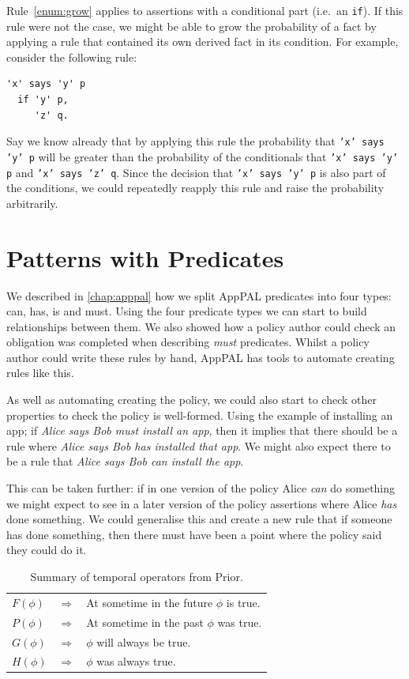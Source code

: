 \documentclass[thesis.tex]{subfiles}
\begin{document}
Rule~\ref{enum:grow} applies to assertions with a conditional part (i.e.~an
\texttt{if}). If this rule were not the case, we might be able to grow the
probability of a fact by applying a rule that contained its own derived fact in
its condition. For example, consider the following rule:
\begin{lstlisting}
'x' says 'y' p
  if 'y' p,
     'z' q.
\end{lstlisting} Say we know already that by applying this rule the probability
that \texttt{'x' says 'y' p} will be greater than the probability of the
conditionals that \texttt{'x' says 'y' p} and \texttt{'x' says 'z' q}. Since the
decision that \texttt{'x' says 'y' p} is also part of the conditions, we could
repeatedly reapply this rule and raise the probability arbitrarily.

\section{Patterns with Predicates}
\label{sec:patterns-with-predicates}

We described in \autoref{chap:apppal} how we split AppPAL predicates into four types: can, has, is and must.
Using the four predicate types we can start to build relationships between them.
We also showed how a policy author could check an obligation was completed when
describing \emph{must} predicates.  Whilst a policy author could write these
rules by hand, AppPAL has tools to automate creating rules like this.

As well as automating creating the policy, we could also start to check other
properties to check the policy is well-formed. Using the example of installing
an app; if \emph{Alice says Bob must install
  an app}, then it implies that there should be a rule where \emph{Alice says
Bob has installed that app}.  We might also expect there to be a rule that
\emph{Alice says Bob can install the app}.

This can be taken further: if in one version of the policy Alice \emph{can} do something we might expect to see in a later version of the policy assertions where Alice \emph{has} done something.  We could generalise this and create a new rule that if someone has done something, then there must have been a point where the policy said they could do it.

\begin{table}\centering\sffamily
 \begin{tabular}{l c l}
   \toprule
     $F(\phi)$ & $\Rightarrow$ & At sometime in the future $\phi$ is true. \\
     $P(\phi)$ & $\Rightarrow$ & At sometime in the past $\phi$ was true. \\
     $G(\phi)$ & $\Rightarrow$ & $\phi$ will always be true. \\
     $H(\phi)$ & $\Rightarrow$ & $\phi$ was always true. \\
   \bottomrule
 \end{tabular}
 \caption{Summary of temporal operators from Prior.}
 \label{tab:temporal-operators}
\end{table}
\end{document}
